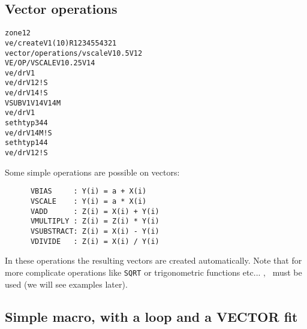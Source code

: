 \subsection{Vector operations}
\begin{alltt}
      zone 1 2
      ve/create V1(10) R 1 2 3 4 5 5 4 3 2 1
      vector/operations/vscale V1 0.5   V12
     VE/OP/VSCALE             V1 0.25  V14
      ve/dr V1
      ve/dr V12 ! S
      ve/dr V14 ! S
     VSUB                      V1 V14 V14M
      ve/dr V1
      set htyp 344
      ve/dr V14M ! S
      set htyp 144
      ve/dr V12  ! S
\end{alltt} 
\begin{DinglistE}
\item Some simple operations are possible on vectors:
\begin{verbatim}
      VBIAS     : Y(i) = a + X(i)
      VSCALE    : Y(i) = a * X(i)
      VADD      : Z(i) = X(i) + Y(i)
      VMULTIPLY : Z(i) = Z(i) * Y(i)
      VSUBSTRACT: Z(i) = X(i) - Y(i)
      VDIVIDE   : Z(i) = X(i) / Y(i)
\end{verbatim}
  In these operations the resulting vectors are created automatically.
  Note that for more complicate operations like {\tt SQRT} or trigonometric
  functions etc... , \SIGMA\ must be used (we will see examples later).
\end{DinglistE}

\clearpage

\subsection{Simple macro, with a loop and a VECTOR fit}

